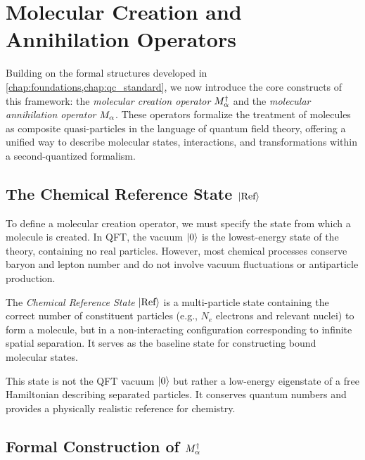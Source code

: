 
\chapter{Molecular Creation and Annihilation Operators}
\label{chap:mol_ops}

Building on the formal structures developed in \cref{chap:foundations,chap:qc_standard}, we now introduce the core constructs of this framework: the \emph{molecular creation operator} \(M^\dagger_{\alpha}\) and the \emph{molecular annihilation operator} \(M_{\alpha}\). These operators formalize the treatment of molecules as composite quasi-particles in the language of quantum field theory, offering a unified way to describe molecular states, interactions, and transformations within a second-quantized formalism.

\section{The Chemical Reference State \texorpdfstring{\(\ket{\text{Ref}}\)}{|Ref⟩}}
\label{sec:mol_ops_ref_state}

To define a molecular creation operator, we must specify the state from which a molecule is created. In QFT, the vacuum \(\ket{0}\) is the lowest-energy state of the theory, containing no real particles. However, most chemical processes conserve baryon and lepton number and do not involve vacuum fluctuations or antiparticle production.

\begin{definition}
	\label{def:ref_state}
	The \emph{Chemical Reference State} \(\ket{\text{Ref}}\) is a multi-particle state containing the correct number of constituent particles (e.g., \(N_e\) electrons and relevant nuclei) to form a molecule, but in a non-interacting configuration corresponding to infinite spatial separation. It serves as the baseline state for constructing bound molecular states.
\end{definition}

This state is not the QFT vacuum \(\ket{0}\) but rather a low-energy eigenstate of a free Hamiltonian describing separated particles. It conserves quantum numbers and provides a physically realistic reference for chemistry.

\section{Formal Construction of \texorpdfstring{\(M^\dagger_{\alpha}\)}{M†\_α}}
\label{sec:mol_ops_construction}

